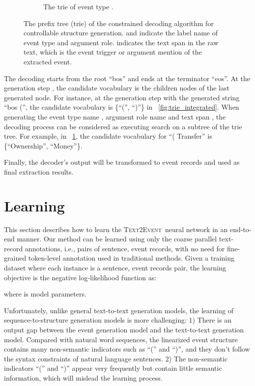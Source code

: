 \documentclass[11pt,a4paper]{article}
\newcommand\modelname{\textsc{Text2Event}}
\begin{document}
\begin{figure}[!tphb]
\bigskip

\begin{subfigure}[b]{0.35\textwidth}
    \caption{The trie of event type .}
    \label{fig:event_type_decoding}
\end{subfigure}

\caption{
  The prefix tree (trie) of the constrained decoding algorithm for controllable structure generation.
   and  indicate the label name of event type and argument role.
   indicates the text span in the raw text, which is the event trigger or argument mention of the extracted event.
}
\label{fig:decoding_stage}
\end{figure} 

The decoding starts from the root ``bos'' and ends at the terminator ``eos''.
At the generation step , the candidate vocabulary  is the children nodes of the last generated node.
For instance, at the generation step with the generated string ``bos ('', the candidate vocabulary  is \{``('', ``)''\} in \figurename~\ref{fig:trie_integrated}.
When generating the event type name , argument role name  and text span , the decoding process can be considered as executing search on a subtree of the trie tree.
For example, in \figurename~\ref{fig:event_type_decoding}, the candidate vocabulary  for ``( Transfer'' is \{``Ownership'', ``Money''\}.

Finally,  the decoder's output will be transformed to event records and used as final extraction results.
 
\section{Learning} \label{sec:learning}
This section describes how to learn the \modelname\, neural network in an end-to-end manner.
Our method can be learned using only the coarse parallel text-record annotations, i.e., pairs of sentence, event records, with no need for fine-grained token-level annotation used in traditional methods.
Given a training dataset  where each instance is a sentence, event records pair, the learning objective is the negative log-likelihood function as:

where  is model parameters.

Unfortunately, unlike general text-to-text generation models, the learning of sequence-to-structure generation models is more challenging:
1) There is an output gap between the event generation model and the text-to-text generation model.
Compared with natural word sequences, the linearized event structure contains many non-semantic indicators such as ``('' and ``)'', and they don't follow the syntax constraints of natural language sentences.
2) The non-semantic indicators ``('' and ``)'' appear very frequently but contain little semantic information, which will mislead the learning process. 
\end{document}
